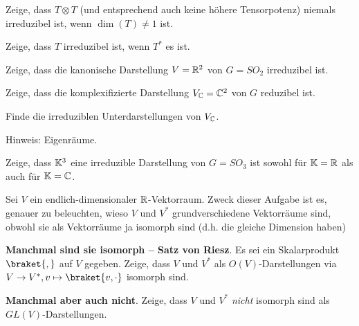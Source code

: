 \begin{sheet}
\begin{problem}[title={Reduzibilität von $T\otimes T$}]
Zeige, dass $T\otimes T$ (und entsprechend auch keine höhere Tensorpotenz) niemals irreduzibel ist, wenn $\dim(T) \neq 1$ ist.
\end{problem}

\begin{problem}[title={Irreduzibilität von $T^\ast\implies$ Irreduzibilität von $T$?}]
Zeige, dass $T$ irreduzibel ist, wenn $T^\ast$ es ist.
\end{problem}

\begin{problem}[title={Kanonische Darstellung von $SO_2$}]\label{ex:fundamentaldarstellung_von_so2}
\begin{subproblem}
Zeige, dass die kanonische Darstellung $V=\mathbb{R}^2$ von $G=SO_2$ irreduzibel ist.
\end{subproblem}
\begin{subproblem}
Zeige, dass die komplexifizierte Darstellung $V_{\mathbb{C}}=\mathbb{C}^2$ von $G$ reduzibel ist.
\end{subproblem}
\begin{subproblem}
Finde die irreduziblen Unterdarstellungen von $V_{\mathbb{C}}$.

Hinweis: Eigenräume.
\end{subproblem}
\end{problem}

\begin{problem}[title={Die kanonische Darstellung von $SO_3$ ist irreduzibel}]\label{ex:fundamentaldarstellung_von_so3}
Zeige, dass $\mathbb{K}^3$ eine irreduzible Darstellung von $G=SO_3$ ist sowohl für $\mathbb{K}=\mathbb{R}$ als auch für $\mathbb{K}=\mathbb{C}$.
\end{problem}

\begin{problem}[title={(Nicht-)Isomorphie von $V$ und $V^\ast$}]
Sei $V$ ein endlich-dimensionaler $\mathbb{R}$-Vektorraum. Zweck dieser Aufgabe ist es, genauer zu beleuchten, wieso $V$ und $V^\ast$ grundverschiedene Vektorräume sind, obwohl sie als Vektorräume ja isomorph sind (d.h. die gleiche Dimension haben)
\begin{subproblem}
\textbf{Manchmal sind sie isomorph -- Satz von Riesz}.
Es sei ein Skalarprodukt $\braket{,}$ auf $V$ gegeben. Zeige, dass $V$ und $V^\ast$ als $O(V)$-Darstellungen via $V\to V^\ast, v\mapsto \braket{v,\cdot}$ isomorph sind.
\end{subproblem}
\begin{subproblem}[difficulty={leicht bis mittel}]
\textbf{Manchmal aber auch nicht}.
Zeige, dass $V$ und $V^\ast$ \emph{nicht} isomorph sind als $GL(V)$-Darstellungen.
\end{subproblem}
\end{problem}


\end{sheet}
